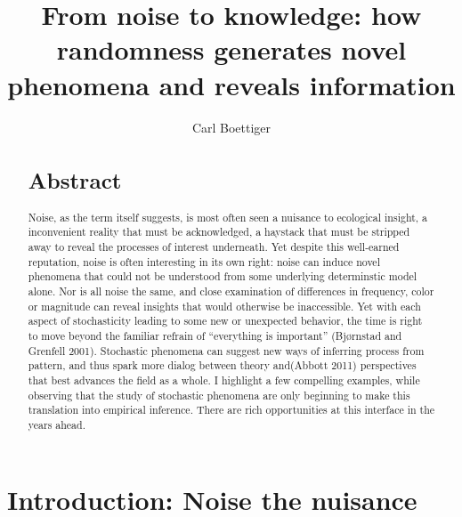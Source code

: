 \documentclass[3p]{elsarticle} %
\begin{document}
\begin{frontmatter}

  \title{From noise to knowledge: how randomness generates novel phenomena and
reveals information}
    \author[a]{Carl Boettiger}
      \address[a]{Dept of Environmental Science, Policy, and Management, University of
California Berkeley, Berkeley CA 94720-3114, USA}
    
  \begin{abstract}
  \hypertarget{abstract}{%
  \section{Abstract}\label{abstract}}
  
  Noise, as the term itself suggests, is most often seen a nuisance to
  ecological insight, a inconvenient reality that must be acknowledged, a
  haystack that must be stripped away to reveal the processes of interest
  underneath. Yet despite this well-earned reputation, noise is often
  interesting in its own right: noise can induce novel phenomena that
  could not be understood from some underlying determinstic model alone.
  Nor is all noise the same, and close examination of differences in
  frequency, color or magnitude can reveal insights that would otherwise
  be inaccessible. Yet with each aspect of stochasticity leading to some
  new or unexpected behavior, the time is right to move beyond the
  familiar refrain of ``everything is important'' (Bjørnstad and Grenfell
  2001). Stochastic phenomena can suggest new ways of inferring process
  from pattern, and thus spark more dialog between theory and(Abbott 2011)
  perspectives that best advances the field as a whole. I highlight a few
  compelling examples, while observing that the study of stochastic
  phenomena are only beginning to make this translation into empirical
  inference. There are rich opportunities at this interface in the years
  ahead.\\
  \end{abstract}
  
 \end{frontmatter}

\newpage

\hypertarget{introduction-noise-the-nuisance}{%
\section{Introduction: Noise the
nuisance}\label{introduction-noise-the-nuisance}}
\end{document}
